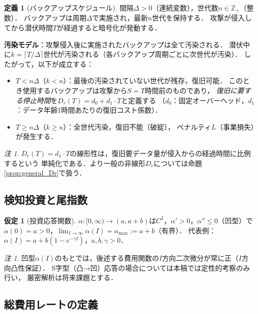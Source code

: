 \documentclass[12pt,a4paper]{article}
\theoremstyle{plain}
\theoremstyle{definition}
\newtheorem{definition}[theorem]{定義}
\newtheorem{assumption}[theorem]{仮定}
\theoremstyle{remark}
\newtheorem{remark}[theorem]{注}
\newcommand{\Z}{\mathbb{Z}}
\begin{document}
\begin{definition}[バックアップスケジュール]
間隔$\Delta>0$（連続変数），世代数$n\in\Z_+$（整数）．
バックアップは周期$\Delta$で実施され，最新$n$世代を保持する．
攻撃が侵入してから潜伏時間$T$が経過すると暗号化が発動する．
\end{definition}

\textbf{汚染モデル}：攻撃侵入後に実施されたバックアップは全て汚染される．
潜伏中に$k=\lceil T/\Delta\rceil$世代が汚染される（各バックアップ周期ごとに次世代が汚染）．
したがって，以下が成立する：
\begin{itemize}
\item $T<n\Delta$（$k<n$）：最後の汚染されていない世代が残存，復旧可能．
  このとき使用するバックアップは攻撃から$S = T$時間前のものであり，
  \emph{復旧に要する停止時間}を$D_r(T)=d_0+d_1\cdot T$と定義する
  （$d_0$：固定オーバーヘッド，$d_1$：データ年齢1時間あたりの復旧コスト係数）．
\item $T\ge n\Delta$（$k\ge n$）：全世代汚染，復旧不能（破綻），
  ペナルティ$L$（事業損失）が発生する．
\end{itemize}

\begin{remark}
$D_r(T)=d_1\cdot T$の線形性は，復旧要データ量が侵入からの経過時間に比例するという
単純化である．より一般の非線形$D_r$については命題\ref{prop:general_Dr}で扱う．
\end{remark}

\subsection{検知投資と尾指数}

\begin{assumption}[投資応答関数]\label{ass:alpha}
$\alpha:[0,\infty)\to(a,a+b)$は$C^2$，$\alpha'>0$，$\alpha''\le0$（凹型）で
$\alpha(0)=a>0$，$\lim_{I\to\infty}\alpha(I)=\alpha_{\max}:=a+b$（有界）．
代表例：$\alpha(I)=a+b(1-e^{-\gamma I})$，$a,b,\gamma>0$．
\end{assumption}

\begin{remark}
凹型$\alpha(I)$のもとでは，後述する費用関数の$I$方向二次微分が常に正（$I$方向凸性保証）．
S字型（凸→凹）応答の場合については本稿では定性的考察のみ行い，
厳密解析は将来課題とする．
\end{remark}

\subsection{総費用レートの定義}
\end{document}
